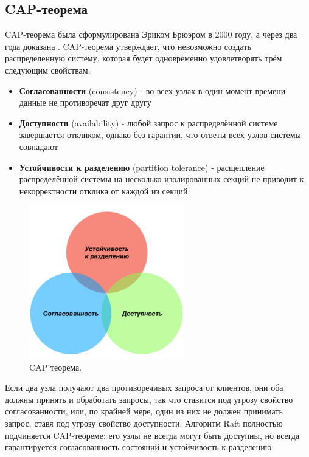 \documentclass[subf, href, colorlinks=true, 14pt,
times, mtpro, specialist]{disser}
\theoremstyle{definition}
\begin{document}
\subsection{CAP-теорема}\label{CAP_theorem}


CAP-теорема была сформулирована Эриком Брюэром в 2000 году, а через два года доказана \cite{CAP_Theorem}. CAP-теорема утверждает, что невозможно создать распределенную систему, которая будет одновременно удовлетворять трём следующим свойствам:
\begin{itemize}
\item \textbf{Согласованности} (consistency) - во всех узлах в один момент времени данные не противоречат друг другу
\item \textbf{Доступности} (availability) - любой запрос к распределённой системе завершается откликом, однако без гарантии, что ответы всех узлов системы совпадают
\item \textbf{Устойчивости к разделению} (partition tolerance) - расщепление распределённой системы на несколько изолированных секций не приводит к некорректности отклика от каждой из секций
\end{itemize}

\begin{figure}[H]
\label{fig:cap_t}
\centering
\includegraphics[width=0.6\textwidth]{src/pics/CAP_t.png}
\caption{CAP теорема.}
\end{figure}


Если два узла получают два противоречивых запроса от клиентов, они оба должны принять и обработать запросы, так что ставится под угрозу свойство согласованности, или, по крайней мере, один из них не должен принимать запрос, ставя под угрозу свойство доступности. Алгоритм Raft полностью подчиняется CAP-теореме: его узлы не всегда могут быть доступны, но всегда гарантируется согласованность состояний и устойчивость к разделению.
\end{document}
